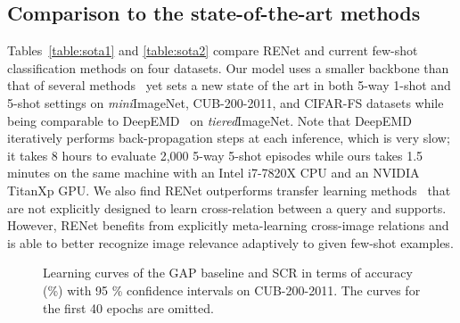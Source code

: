 \documentclass[10pt,twocolumn,letterpaper]{article}
\newcommand{\itmini}{\textit{mini}}
\newcommand{\ittiered}{\textit{tiered}}
\newcommand{\ours}{RENet\xspace}
\newcommand{\abbself}{SCR\xspace}
\begin{document}
\subsection{Comparison to the state-of-the-art methods}
Tables~\ref{table:sota1} and \ref{table:sota2} compare \ours and current few-shot classification methods on four datasets.
Our model uses a smaller backbone than that of several methods~\cite{qiao2018few, wDAE, leo, s2m2} yet sets a new state of the art in both 5-way 1-shot and 5-shot settings on \itmini ImageNet, CUB-200-2011, and CIFAR-FS datasets while being comparable to DeepEMD~\cite{deepemd} on \ittiered ImageNet.
Note that DeepEMD iteratively performs back-propagation steps at each inference, which is very slow; it takes 8 hours to evaluate 2,000 5-way 5-shot episodes while ours takes 1.5 minutes on the same machine with an Intel i7-7820X CPU and an NVIDIA TitanXp GPU.
We also find \ours outperforms transfer learning methods~\cite{closer, simpleshot, negmargin, rfs} that are not explicitly designed to learn cross-relation between a query and supports.
However, \ours benefits from explicitly meta-learning cross-image relations and is able to better recognize image relevance adaptively to given few-shot examples.








\begin{figure}[t!]
\centering
{}
\caption{
Learning curves of the GAP baseline and \abbself in terms of accuracy (\%) with 95 \% confidence intervals on CUB-200-2011.
The curves for the first 40 epochs are omitted.
\label{fig:overfitting}}
\end{figure}
\end{document}
